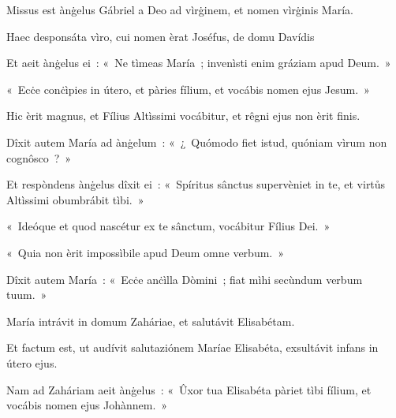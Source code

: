 
Missus est ànġelus Gábriel a Deo ad vìrġinem, et nomen vìrġinis María. 

Haec desponsáta vìro, cui nomen èrat Joséfus, de domu Davídis 

Et aeit ànġelus ei~: «~Ne tìmeas María~; invenìsti enim gráziam apud Deum.~» 

«~Ecċe conċìpies in útero, et pàries fílium, et vocábis nomen ejus Jesum.~» 

Hic èrit magnus, et Fílius Altìssimi vocábitur, et rêgni ejus non èrit finis. 

Dîxit autem María ad ànġelum~: «~¿~Quómodo fiet istud, quóniam vìrum non cognôsco~?~» 

Et respòndens ànġelus dîxit ei~: «~Spíritus sânctus supervèniet in te, et virtůs Altìssimi obumbrábit tìbi.~» 

«~Ideóque et quod nascétur ex te sânctum, vocábitur Fílius Dei.~» 

«~Quia non èrit impossìbile apud Deum omne verbum.~» 

Dîxit autem María~: «~Ecċe anċìlla Dòmini~; fiat mìhi secùndum verbum tuum.~» 

\mysteryEnd
{}

María intrávit in domum Zaháriae, et salutávit Elisabétam. 

Et factum est, ut audívit salutaziónem Maríae Elisabéta, exsultávit infans in útero ejus. 

Nam ad Zaháriam aeit ànġelus~: «~Ûxor tua Elisabéta pàriet tìbi fílium, et vocábis nomen ejus Johànnem.~» 

